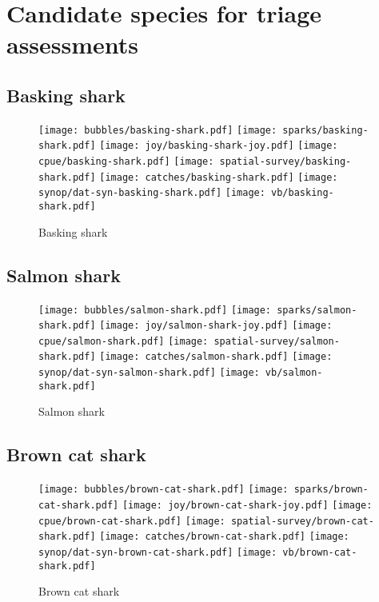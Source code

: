 \section*{Candidate species for triage assessments}
\subsection*{Basking shark}

\begin{figure}[htbp]
\centering
\texttt{[image: bubbles/basking-shark.pdf]}
\texttt{[image: sparks/basking-shark.pdf]}
\texttt{[image: joy/basking-shark-joy.pdf]}
\texttt{[image: cpue/basking-shark.pdf]}
\texttt{[image: spatial-survey/basking-shark.pdf]}
\texttt{[image: catches/basking-shark.pdf]}
\texttt{[image: synop/dat-syn-basking-shark.pdf]}
\texttt{[image: vb/basking-shark.pdf]}
\caption{Basking shark}
\end{figure}
\clearpage
\subsection*{Salmon shark}

\begin{figure}[htbp]
\centering
\texttt{[image: bubbles/salmon-shark.pdf]}
\texttt{[image: sparks/salmon-shark.pdf]}
\texttt{[image: joy/salmon-shark-joy.pdf]}
\texttt{[image: cpue/salmon-shark.pdf]}
\texttt{[image: spatial-survey/salmon-shark.pdf]}
\texttt{[image: catches/salmon-shark.pdf]}
\texttt{[image: synop/dat-syn-salmon-shark.pdf]}
\texttt{[image: vb/salmon-shark.pdf]}
\caption{Salmon shark}
\end{figure}
\clearpage
\subsection*{Brown cat shark}

\begin{figure}[htbp]
\centering
\texttt{[image: bubbles/brown-cat-shark.pdf]}
\texttt{[image: sparks/brown-cat-shark.pdf]}
\texttt{[image: joy/brown-cat-shark-joy.pdf]}
\texttt{[image: cpue/brown-cat-shark.pdf]}
\texttt{[image: spatial-survey/brown-cat-shark.pdf]}
\texttt{[image: catches/brown-cat-shark.pdf]}
\texttt{[image: synop/dat-syn-brown-cat-shark.pdf]}
\texttt{[image: vb/brown-cat-shark.pdf]}
\caption{Brown cat shark}
\end{figure}
\clearpage
